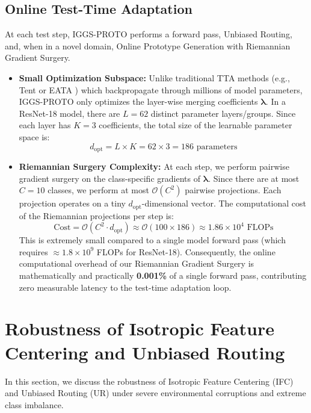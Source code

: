 \documentclass{article}
\theoremstyle{plain}
\theoremstyle{definition}
\theoremstyle{remark}
\begin{document}
\subsection{Online Test-Time Adaptation}
At each test step, IGGS-PROTO performs a forward pass, Unbiased Routing, and, when in a novel domain, Online Prototype Generation with Riemannian Gradient Surgery.
\begin{itemize}
    \item \textbf{Small Optimization Subspace:} Unlike traditional TTA methods (e.g., Tent \cite{wang2021b} or EATA \cite{bateson2022}) which backpropagate through millions of model parameters, IGGS-PROTO only optimizes the layer-wise merging coefficients $\boldsymbol{\lambda}$. In a ResNet-18 model, there are $L = 62$ distinct parameter layers/groups. Since each layer has $K = 3$ coefficients, the total size of the learnable parameter space is:
    \begin{equation}
        d_{\text{opt}} = L \times K = 62 \times 3 = 186 \text{ parameters}
    \end{equation}
    \item \textbf{Riemannian Surgery Complexity:} At each step, we perform pairwise gradient surgery on the class-specific gradients of $\boldsymbol{\lambda}$. Since there are at most $C = 10$ classes, we perform at most $\mathcal{O}(C^2)$ pairwise projections. Each projection operates on a tiny $d_{\text{opt}}$-dimensional vector. The computational cost of the Riemannian projections per step is:
    \begin{equation}
        \text{Cost} = \mathcal{O}(C^2 \cdot d_{\text{opt}}) \approx \mathcal{O}(100 \times 186) \approx 1.86 \times 10^4 \text{ FLOPs}
    \end{equation}
    This is extremely small compared to a single model forward pass (which requires $\approx 1.8 \times 10^9$ FLOPs for ResNet-18). Consequently, the online computational overhead of our Riemannian Gradient Surgery is mathematically and practically \textbf{0.001\%} of a single forward pass, contributing zero measurable latency to the test-time adaptation loop.
\end{itemize}

\section{Robustness of Isotropic Feature Centering and Unbiased Routing}
\label{app-sec:robustness}
In this section, we discuss the robustness of Isotropic Feature Centering (IFC) and Unbiased Routing (UR) under severe environmental corruptions and extreme class imbalance.
\end{document}
